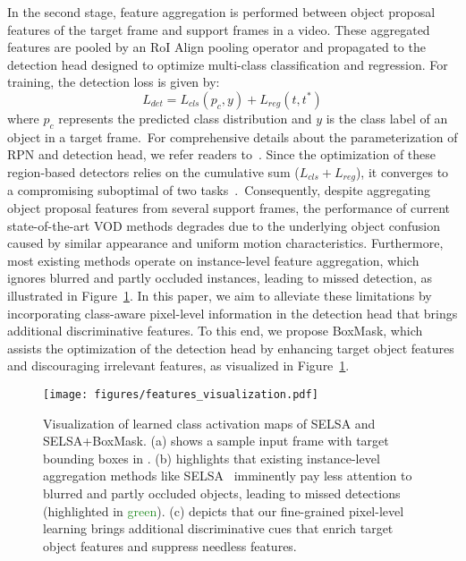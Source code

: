 \documentclass[10pt,twocolumn,letterpaper]{article}
\begin{document}
In the second stage, feature aggregation is performed between object proposal features of the target frame and support frames in a video. These aggregated features are pooled by an RoI Align pooling operator and propagated to the detection head designed to optimize multi-class classification and regression. For training, the detection loss is given by:
\begin{equation}
\label{eq:rcnn_loss}
    L_{det} = L_{cls}(p_{c},y) + L_{reg}(t, t^{*}) 
\end{equation}
where $p_{c}$ represents the predicted class distribution and $y$ is the class label of an object in a target frame.~For comprehensive details about the parameterization of RPN and detection head, we refer readers to~\cite{ren2015faster}. Since the optimization of these region-based detectors relies on the cumulative sum ($L_{cls} + L_{reg}$), it converges to a compromising suboptimal of two tasks~\cite{cheng2018revisiting}.~Consequently, despite aggregating object proposal features from several support frames, the performance of current state-of-the-art VOD methods degrades due to the underlying object confusion caused by similar appearance and uniform motion characteristics. Furthermore, most existing methods operate on instance-level feature aggregation, which ignores blurred and partly occluded instances, leading to missed detection, as illustrated in Figure~\ref{fig:feature_vis}\color{red}{(b)}\color{black}. In this paper, we aim to alleviate these limitations by incorporating class-aware pixel-level information in the detection head that brings additional discriminative features. To this end, we propose BoxMask, which assists the optimization of the detection head by enhancing target object features and discouraging irrelevant features, as visualized in Figure~\ref{fig:feature_vis}\color{red}{(c)}\color{black}.

\begin{figure}
\centering
\texttt{[image: figures/features\_visualization.pdf]}
\caption{Visualization of learned class activation maps of SELSA and SELSA+BoxMask. (a) shows a sample input frame with target bounding boxes in \color{red}{red}\color{black}. (b) highlights that existing instance-level aggregation methods like SELSA~\cite{wu2019sequence} imminently pay less attention to blurred and partly occluded objects, leading to missed detections (highlighted in \textcolor{ForestGreen}{green}\color{black}). (c) depicts that our fine-grained pixel-level learning brings additional discriminative cues that enrich target object features and suppress needless features.}
\label{fig:feature_vis}
\vspace{-10pt}
\end{figure}
\end{document}
